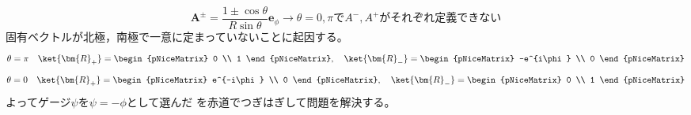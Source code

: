 \documentclass[a4paper,11pt,dvipdfmx]{jsarticle}
\theoremstyle{definition}%
\numberwithin{equation}{section}%
\numberwithin{theorem}{section} %
\begin{document}
\begin{enumerate}[1.]
  \begin{equation}
    \bm{A}^\pm=\frac{1\pm\cos\theta}{R\sin\theta}\bm{e}_\phi\rightarrow \theta=0,\pi\text{で}A^-,A^+\text{がそれぞれ定義できない}
  \end{equation}
  固有ベクトルが北極，南極で一意に定まっていないことに起因する。
  \begin{equation}
    \theta=\pi \quad \ket{\bm{R}_+}=\begin{pNiceMatrix}
      0 \\
      1
    \end{pNiceMatrix}, \quad \ket{\bm{R}_-}=\begin{pNiceMatrix}
      -e^{i\phi} \\
      0
    \end{pNiceMatrix}
  \end{equation}
  \begin{equation}
    \theta=0 \quad \ket{\bm{R}_+}=\begin{pNiceMatrix}
      e^{-i\phi} \\
      0
    \end{pNiceMatrix}, \quad \ket{\bm{R}_-}=\begin{pNiceMatrix}
      0 \\
      1
    \end{pNiceMatrix}
  \end{equation}
  よってゲージ\(\psi\)を\(\psi=-\phi\)として選んだ
  を赤道でつぎはぎして問題を解決する。
  
\end{enumerate}
\end{document}
